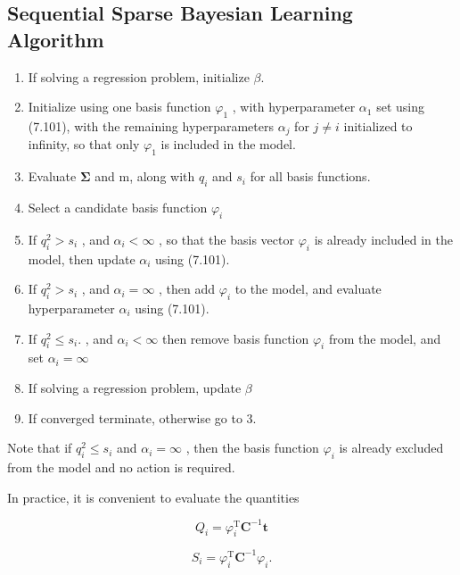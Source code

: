 \documentclass[
  10
]{article}
\begin{document}
\subsection{Sequential Sparse Bayesian Learning
Algorithm}\label{sequential-sparse-bayesian-learning-algorithm}

\begin{enumerate}
\def\labelenumi{\arabic{enumi}.}
\item
  If solving a regression problem, initialize \(\beta .\)
\item
  Initialize using one basis function \(\varphi _ { 1 }\) , with
  hyperparameter \(\alpha _ { 1 }\) set using (7.101), with the
  remaining hyperparameters \(\alpha _ { j }\) for \(j \neq i\)
  initialized to infinity, so that only \(\varphi _ { 1 }\) is included
  in the model.
\item
  Evaluate \(\pmb { \Sigma }\) and m, along with \(q _ { i }\) and
  \(s _ { i }\) for all basis functions.
\item
  Select a candidate basis function \(\varphi _ { i }\)
\item
  If \(q _ { i } ^ { 2 } > s _ { i }\) , and \(\alpha _ { i } < \infty\)
  , so that the basis vector \(\varphi _ { i }\) is already included in
  the model, then update \(\alpha _ { i }\) using (7.101).
\item
  If \(q _ { i } ^ { 2 } > s _ { i }\) , and \(\alpha _ { i } = \infty\)
  , then add \(\varphi _ { i }\) to the model, and evaluate
  hyperparameter \(\alpha _ { i }\) using (7.101).
\item
  If \(q _ { i } ^ { 2 } \leqslant s _ { i } .\) , and
  \(\alpha _ { i } < \infty\) then remove basis function
  \(\varphi _ { i }\) from the model, and set
  \(\alpha _ { i } = \infty\)
\item
  If solving a regression problem, update \(\beta\)
\item
  If converged terminate, otherwise go to 3.
\end{enumerate}

Note that if \(q _ { i } ^ { 2 } \leqslant s _ { i }\) and
\(\alpha _ { i } = \infty\) , then the basis function
\(\varphi _ { i }\) is already excluded from the model and no action is
required.

In practice, it is convenient to evaluate the quantities

\[
Q _ {i} = \varphi_ {i} ^ {\mathrm{T}} \mathbf {C} ^ {- 1} \mathbf {t}\tag{7.102}
\]

\[
{S _ {i}} = {\varphi_ {i} ^ {\mathrm{T}} \mathbf {C} ^ {- 1} \varphi_ {i}.}\tag{7.103}
\]
\end{document}
